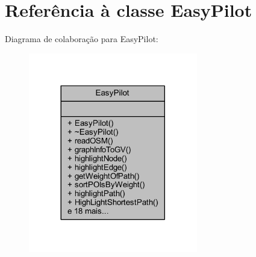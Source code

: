 \hypertarget{class_easy_pilot}{}\section{Referência à classe Easy\+Pilot}
\label{class_easy_pilot}


Diagrama de colaboração para Easy\+Pilot\+:
\nopagebreak
\begin{figure}[H]
\begin{center}
\leavevmode
\includegraphics[width=209pt]{class_easy_pilot__coll__graph}
\end{center}
\end{figure}
